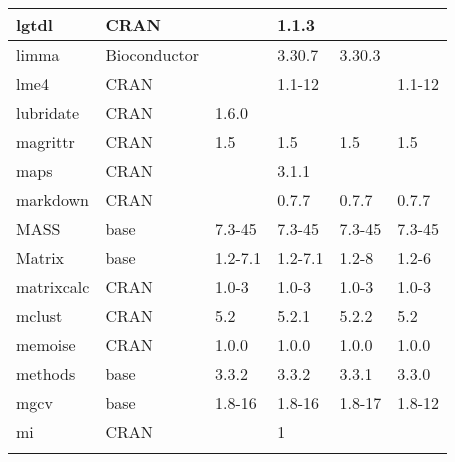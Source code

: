 \begin{longtable}{|llllll|}
lgtdl                         & CRAN                      &             & 1.1.3       &                &                   \\ \hline \rowcolor{gray!25}
limma                         & Bioconductor              &             & 3.30.7      & 3.30.3         &                  \\ \hline
lme4                          & CRAN                      &             & 1.1-12      &                & 1.1-12            \\ \hline \rowcolor{gray!25}
lubridate                     & CRAN                      & 1.6.0       &             &                &                  \\ \hline
magrittr                      & CRAN                      & 1.5         & 1.5         & 1.5            & 1.5               \\ \hline \rowcolor{gray!25}
maps                          & CRAN                      &             & 3.1.1       &                &                  \\ \hline
markdown                      & CRAN                      &             & 0.7.7       & 0.7.7          & 0.7.7             \\ \hline \rowcolor{gray!25}
MASS                          & base                      & 7.3-45      & 7.3-45      & 7.3-45         & 7.3-45           \\ \hline
Matrix                        & base                      & 1.2-7.1     & 1.2-7.1     & 1.2-8          & 1.2-6             \\ \hline \rowcolor{gray!25}
matrixcalc                    & CRAN                      & 1.0-3       & 1.0-3       & 1.0-3          & 1.0-3            \\ \hline
mclust                        & CRAN                      & 5.2         & 5.2.1       & 5.2.2          & 5.2               \\ \hline \rowcolor{gray!25}
memoise                       & CRAN                      & 1.0.0       & 1.0.0       & 1.0.0          & 1.0.0            \\ \hline
methods                       & base                      & 3.3.2       & 3.3.2       & 3.3.1          & 3.3.0             \\ \hline \rowcolor{gray!25}
mgcv                          & base                      & 1.8-16      & 1.8-16      & 1.8-17         & 1.8-12           \\ \hline
mi                            & CRAN                      &             & 1           &                &                   \\ \hline \rowcolor{gray!25}

\end{longtable}
